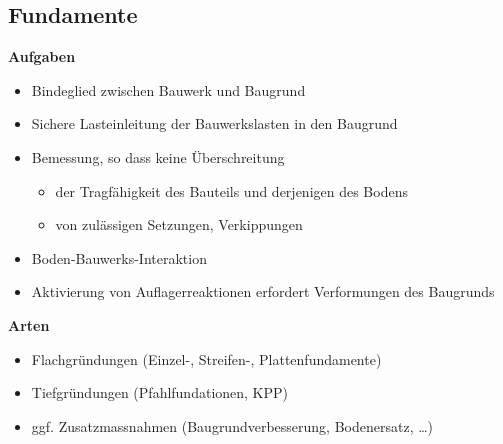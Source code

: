 \begin{multicols}{2}
	
		
		\section{Fundamente}
			
			\textbf{Aufgaben}
			
				\begin{itemize}
					
					\item Bindeglied zwischen Bauwerk und Baugrund
					
					\item Sichere Lasteinleitung der Bauwerkslasten in den Baugrund
					
					\item  Bemessung, so dass keine Überschreitung
						\begin{itemize}
							
							\item der Tragfähigkeit des Bauteils und derjenigen des Bodens

							\item von zulässigen Setzungen, Verkippungen	
							
						\end{itemize}
					
					\item Boden-Bauwerks-Interaktion
					
					\item Aktivierung von Auflagerreaktionen erfordert Verformungen des Baugrunds
					
				\end{itemize}
		
		
		
		\textbf{Arten}
		
		\begin{itemize}
			
			\item Flachgründungen (Einzel-, Streifen-, Plattenfundamente)
			
			\item Tiefgründungen (Pfahlfundationen, KPP)
			
			\item ggf. Zusatzmassnahmen (Baugrundverbesserung, Bodenersatz, …)
			

\end{itemize}
\end{multicols}
